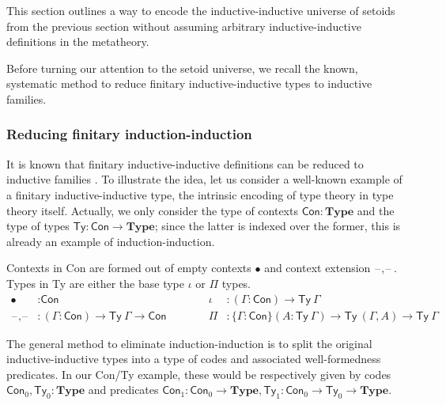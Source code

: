 \documentclass[autoref]{llncs}
\newcommand{\GG}{\Gamma}
\newcommand{\mType}{\mathbf{Type}}
\newcommand{\blank}{\mathord{\hspace{1pt}\text{--}\hspace{1pt}}}
\begin{document}
This section outlines a way to encode the inductive-inductive universe of
setoids from the previous section without assuming arbitrary inductive-inductive
definitions in the metatheory.

Before turning our attention to the setoid universe, we recall the known,
systematic method to reduce finitary inductive-inductive types to inductive
families.

\subsubsection{Reducing finitary induction-induction}

It is known that finitary inductive-inductive definitions can be reduced to
inductive families \cite{iit-erasure,iit-to-ix,induction-is-enough}.
%
To illustrate the idea, let us consider a well-known example of a finitary
inductive-inductive type, the intrinsic encoding of type theory in type theory
itself. Actually, we only consider the type of contexts $\textsf{Con} :
\mType$ and the type of types $\textsf{Ty} : \textsf{Con} \to \mType$; since the
latter is indexed over the former, this is already an example of
induction-induction.

Contexts in \textsf{Con} are formed out of empty contexts $\bullet$ and context
extension $\blank,\blank$. Types in \textsf{Ty} are either the base type $\iota$ or
$\Pi$ types.
\vspace{-0.2em}
\begin{align*}
  \bullet &: \textsf{Con}                                                                  &  \iota &: (\GG : \textsf{Con}) \to \textsf{Ty}\ \GG \\
  \blank,\blank &: (\GG : \textsf{Con}) \to \textsf{Ty}\ \GG \to \textsf{Con} \hspace{3em} &  \Pi &: \{\GG : \textsf{Con}\} (A : \textsf{Ty}\ \GG) \to \textsf{Ty}\ (\GG , A) \to \textsf{Ty}\ \GG
\end{align*}

The general method to eliminate induction-induction is to split the original
inductive-inductive types into a type of codes and associated well-formedness
predicates. In our \textsf{Con/Ty} example, these would be respectively given by
codes $\textsf{Con}_0, \textsf{Ty}_0 : \mType$ and predicates $\textsf{Con}_1 :
\textsf{Con}_0 \to \mType, \textsf{Ty}_1 : \textsf{Con}_0 \to \textsf{Ty}_0 \to
\mType$.
\end{document}
